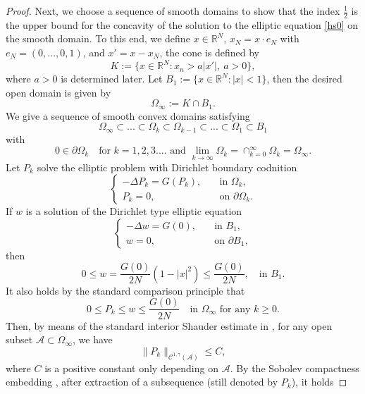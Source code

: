 \documentclass[10pt]{article}         %
\numberwithin{equation}{section}
\begin{document}
\begin{proof}
Next, we choose a sequence of smooth domains to show that the index $\frac{1}{2}$ is the upper bound for the concavity of the solution to the elliptic equation \eqref{hs0} on the smooth domain. To this end, we define $x\in\mathbb{R}^N$,  $x_N=x\cdot e_N$ with $e_N=(0,...,0,1)$, and $x'=x-x_N$, the cone is defined by 
\[K:=\{x\in \mathbb{R}^N: x_n> a |x'|,\ a>0\},\]
where $a>0
$ is determined later. Let $B_1:=\{x\in \mathbb{R}^N: |x|< 1\}$, then the desired   open domain is given by 
\[\Omega_\infty:=K\cap B_1.\]%
We give a sequence of smooth convex domains satisfying
\begin{equation}\label{omegak}\Omega_\infty\subset...\subset \Omega_k\subset\Omega_{k-1}\subset...\subset\Omega_1\subset B_1 
\end{equation}
with 
\[0\in\partial\Omega_k\quad\text{for } k=1,2,3.... \text{ and } \lim\limits_{k\to\infty}\Omega_k=\cap_{k=0}^{\infty}\Omega_k=\Omega_\infty.\]
Let $P_{k}$ solve the elliptic problem with Dirichlet boundary codnition
\begin{equation}\label{omegake}
\begin{cases}
-\Delta P_{k}=G(P_{k}),\quad &\text{in }\Omega_k,\\
P_{k}=0,\quad&\text{on }\partial\Omega_k.
\end{cases}
\end{equation}
If $w$ is a solution of the Dirichlet type elliptic equation 
\begin{equation*}
\begin{cases}-\Delta w=G(0),\quad &\text{in }B_1,\\w=0,\quad&\text{on }\partial B_1,\end{cases}\end{equation*}
then
\[0\leq w=\frac{G(0)}{2N}(1-|x|^2)\leq \frac{G(0)}{2N},\quad \text{in }B_1. \] 
It also holds by the standard comparison principle that
\begin{equation}\label{pkb}0\leq P_{k}\leq w\leq \frac{G(0)}{2N}\quad \text{in }\Omega_\infty \text{ for any }k\geq 0.\end{equation}
Then, by means of the standard interior Shauder estimate in \cite{GT2001}, for any open subset $\mathcal{A}\subset \Omega_\infty$, we have
\[\|P_{k}\|_{\mathcal{C}^{1,\gamma}(\mathcal{A})}\leq C,\]
where $C$ is a positive constant only depending on $\mathcal{A}$.  By the Sobolev compactness embedding \cite{ELC2010}, after extraction of a subsequence (still denoted by $P_{k}$), it holds

\end{proof}
\end{document}
